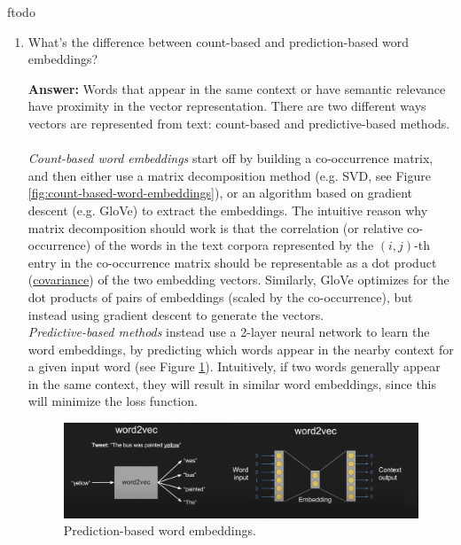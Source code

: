 ƒtodo\documentclass{article}
\newenvironment{QandA}{\begin{enumerate}[label=\arabic*.]}{\end{enumerate}}
\newenvironment{InnerQandA}{\begin{enumerate}[label=\roman*.]}{\end{enumerate}}
\newenvironment{answer}{\par\normalfont \textbf{Answer:}}{}
\begin{document}
\begin{QandA}
\begin{InnerQandA}
        \item What’s the difference between count-based and prediction-based word embeddings?
        \begin{answer}
            Words that appear in the same context or have semantic relevance have proximity in the vector representation. There are two different ways vectors are represented from text: count-based and predictive-based methods.\\\\
            \textit{Count-based word embeddings} start off by building a co-occurrence matrix, and then either use a matrix decomposition method (e.g. SVD, see Figure \ref{fig:count-based-word-embeddings}), or an algorithm based on gradient descent (e.g. GloVe) to extract the embeddings. The intuitive reason why matrix decomposition should work is that the correlation (or relative co-occurrence) of the words in the text corpora represented by the $(i,j)$-th entry in the co-occurrence matrix should be representable as a dot product (\href{https://www.quora.com/Is-there-any-relation-between-correlation-of-two-signals-and-dot-product-of-two-vectors}{covariance}) of the two embedding vectors. Similarly, GloVe optimizes for the dot products of pairs of embeddings (scaled by the co-occurrence), but instead using gradient descent to generate the vectors. \\
            
            
            \noindent \textit{Predictive-based methods} instead use a 2-layer neural network to learn the word embeddings, by predicting which words appear in the nearby context for a given input word (see Figure \ref{fig:prediction-based-word-embeddings}). Intuitively, if two words generally appear in the same context, they will result in similar word embeddings, since this will minimize the loss function.

            \begin{figure}[h!]
                \centering
                \includegraphics[width=0.8\columnwidth]{img/word2vec.png}
                \caption{Prediction-based word embeddings\footnotemark.}
                \label{fig:prediction-based-word-embeddings}
            \end{figure}
        \end{answer}


\end{InnerQandA}
\end{QandA}
\end{document}
